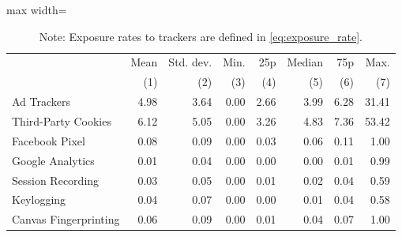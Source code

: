 \documentclass[12pt, letterpaper]{article}
\begin{document}


\begin{table}[ht]
\centering
\small
\setlength\tabcolsep{12 pt}
\setlength{\defaultaddspace}{0pt}
\def\sym#1{\ifmmode^{#1}\else\(^{#1}\)\fi}
\caption{Summary of exposure rate}
\label{tab:exposure-rate}
\begin{adjustbox}{max width=\textwidth}
\begin{tabular}{@{\hspace{0\tabcolsep}}lrrrrrrr@{\hspace{0\tabcolsep}}}
    \toprule\toprule
    & Mean & Std. dev. & Min. & 25p & Median & 75p & Max.\\
    &\multicolumn{1}{r}{(1)}         &\multicolumn{1}{r}{(2)}         &\multicolumn{1}{r}{(3)}         &\multicolumn{1}{r}{(4)}         &\multicolumn{1}{r}{(5)}         &\multicolumn{1}{r}{(6)}         &\multicolumn{1}{r}{(7)}\\
    \midrule
    
Ad Trackers & 4.98 & 3.64 & 0.00 & 2.66 & 3.99 & 6.28 & 31.41 \\
Third-Party Cookies & 6.12 & 5.05 & 0.00 & 3.26 & 4.83 & 7.36 & 53.42 \\
Facebook Pixel & 0.08 & 0.09 & 0.00 & 0.03 & 0.06 & 0.11 & 1.00 \\
Google Analytics & 0.01 & 0.04 & 0.00 & 0.00 & 0.00 & 0.01 & 0.99 \\
Session Recording & 0.03 & 0.05 & 0.00 & 0.01 & 0.02 & 0.04 & 0.59 \\
Keylogging & 0.04 & 0.07 & 0.00 & 0.00 & 0.01 & 0.04 & 0.58 \\
Canvas Fingerprinting & 0.06 & 0.09 & 0.00 & 0.01 & 0.04 & 0.07 & 1.00 \\

   \bottomrule
\end{tabular}
\end{adjustbox}
\caption*{\footnotesize Note:
    Exposure rates to trackers are defined in \cref{eq:exposure_rate}.
}
\end{table}
\end{document}
